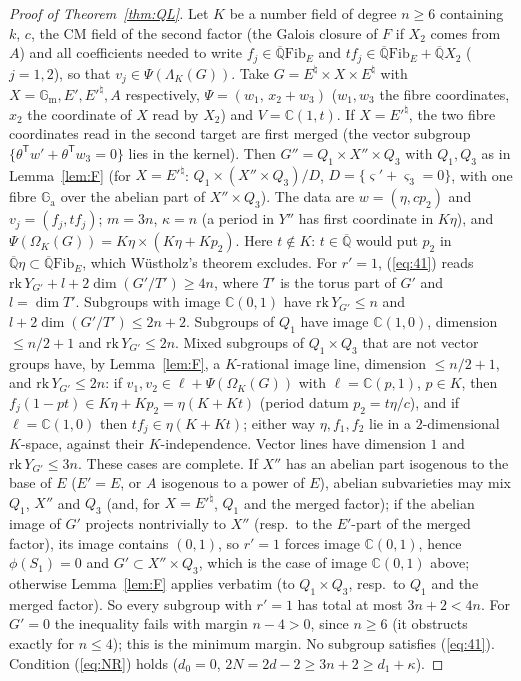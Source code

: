 \documentclass[11pt]{amsart}
\theoremstyle{definition}
\newcommand{\Qb}{\overline{\mathbb{Q}}}
\newcommand{\C}{\mathbb{C}}
\newcommand{\Ga}{\mathbb{G}_{\mathrm a}}
\newcommand{\Gm}{\mathbb{G}_{\mathrm m}}
\newcommand{\Fib}{\mathrm{Fib}}
\begin{document}
\begin{proof}[Proof of Theorem~\ref{thm:QL}]
Let $K$ be a number field of degree $n\ge6$ containing $k$, $c$, the CM field of the second factor (the Galois closure of
$F$ if $X_2$ comes from $A$) and all coefficients needed to write $f_j\in\Qb\Fib_E$ and $tf_j\in\Qb\Fib_E+\Qb X_2$
($j=1,2$), so that $v_j\in\Psi(\Lambda_K(G))$. Take $G=E^\natural\times X\times E^\natural$ with
$X=\Gm,E',E'^\natural,A$ respectively, $\Psi=(w_1,\,x_2+w_3)$ ($w_1,w_3$ the fibre coordinates, $x_2$ the coordinate of
$X$ read by $X_2$) and $V=\C(1,t)$. If $X=E'^\natural$, the two fibre coordinates read in the second target are first
merged (the vector subgroup $\{\theta^{\mathsf T}w'+\theta^{\mathsf T}w_3=0\}$ lies in the kernel). Then
$G''=Q_1\times X''\times Q_3$ with $Q_1,Q_3$ as in Lemma~\ref{lem:F} (for $X=E'^\natural$: $Q_1\times(X''\times Q_3)/D$,
$D=\{\varsigma'+\varsigma_3=0\}$, with one fibre $\Ga$ over the abelian part of $X''\times Q_3$). The data are
$w=(\eta,cp_2)$ and $v_j=(f_j,tf_j)$; $m=3n$, $\kappa=n$ (a period in $Y''$ has first coordinate in $K\eta$), and
$\Psi(\Omega_K(G))=K\eta\times(K\eta+Kp_2)$. Here $t\notin K$: $t\in\Qb$ would put $p_2$ in $\Qb\eta\subset\Qb\Fib_E$, which
W\"ustholz's theorem \cite{Wu89} excludes. For $r'=1$, (\ref{eq:41}) reads $\mathrm{rk}\,Y_{G'}+l+2\dim(G'/T')\ge4n$,
where $T'$ is the torus part of $G'$ and $l=\dim T'$. Subgroups with image $\C(0,1)$ have $\mathrm{rk}\,Y_{G'}\le n$ and
$l+2\dim(G'/T')\le2n+2$. Subgroups of $Q_1$ have image $\C(1,0)$, dimension $\le n/2+1$ and $\mathrm{rk}\,Y_{G'}\le2n$.
Mixed subgroups of $Q_1\times Q_3$ that are not vector groups have, by Lemma~\ref{lem:F}, a $K$-rational image line, dimension
$\le n/2+1$, and $\mathrm{rk}\,Y_{G'}\le2n$: if $v_1,v_2\in\ell+\Psi(\Omega_K(G))$ with $\ell=\C(p,1)$, $p\in K$, then
$f_j(1-pt)\in K\eta+Kp_2=\eta(K+Kt)$ (period datum $p_2=t\eta/c$), and if $\ell=\C(1,0)$ then $tf_j\in\eta(K+Kt)$; either
way $\eta,f_1,f_2$ lie in a $2$-dimensional $K$-space, against their $K$-independence. Vector lines have dimension $1$ and
$\mathrm{rk}\,Y_{G'}\le3n$. These cases are complete. If $X''$ has an abelian part isogenous to the base of $E$ ($E'=E$, or
$A$ isogenous to a power of $E$), abelian subvarieties may mix $Q_1$, $X''$ and $Q_3$ (and, for $X=E'^\natural$, $Q_1$ and
the merged factor); if the abelian image of $G'$ projects nontrivially to $X''$ (resp.\ to the $E'$-part of the merged
factor), its image contains $(0,1)$, so $r'=1$ forces image $\C(0,1)$, hence $\phi(S_1)=0$ and $G'\subset X''\times Q_3$,
which is the case of image $\C(0,1)$ above; otherwise Lemma~\ref{lem:F} applies verbatim (to $Q_1\times Q_3$, resp.\ to
$Q_1$ and the merged factor). So every subgroup with $r'=1$ has total at most $3n+2<4n$. For $G'=0$ the inequality fails
with margin $n-4>0$, since $n\ge6$ (it obstructs exactly for $n\le4$); this is the minimum margin. No subgroup satisfies
(\ref{eq:41}). Condition (\ref{eq:NR}) holds
($d_0=0$, $2N=2d-2\ge3n+2\ge d_1+\kappa$).
\end{proof}
\end{document}
